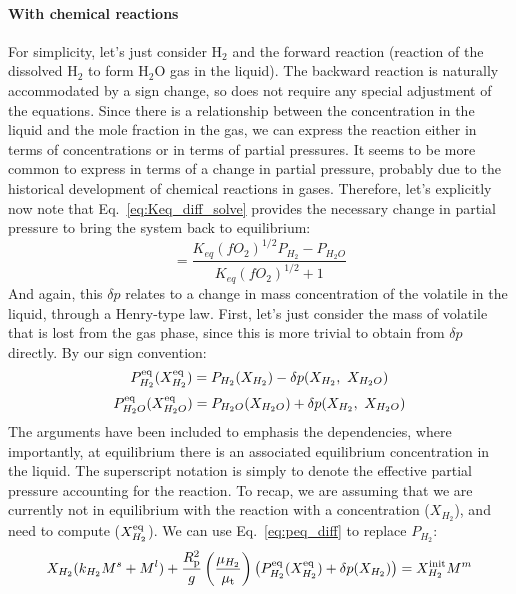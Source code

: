 \paragraph{With chemical reactions}
For simplicity, let's just consider H$_2$ and the forward reaction (reaction of the dissolved H$_2$ to form H$_2$O gas in the liquid).  The backward reaction is naturally accommodated by a sign change, so does not require any special adjustment of the equations.  Since there is a relationship between the concentration in the liquid and the mole fraction in the gas, we can express the reaction either in terms of concentrations or in terms of partial pressures.  It seems to be more common to express in terms of a change in partial pressure, probably due to the historical development of chemical reactions in gases.  Therefore, let's explicitly now note that Eq.~\ref{eq:Keq_diff_solve} provides the necessary change in partial pressure to bring the system back to equilibrium:
\begin{equation}
[\delta p] = \frac{K_{eq} (fO_2)^{1/2} P_{H_2} - P_{H_2O}}{K_{eq} (fO_2)^{1/2} + 1}
\label{eq:Keq_diff_solve2}
\end{equation}
And again, this $\delta p$ relates to a change in mass concentration of the volatile in the liquid, through a Henry-type law.  First, let's just consider the mass of volatile that is lost from the gas phase, since this is more trivial to obtain from $\delta p$ directly.  By our sign convention:
\begin{equation}
P_{H_2}^{\rm eq} (X_{H_2}^{\rm eq}) = P_{H_2}(X_{H_2}) - \delta p (X_{H_2},\ X_{H_2O})
\label{eq:peq_diff}
\end{equation}
\begin{equation}
P_{H_2O}^{\rm eq} (X_{H_2O}^{\rm eq}) = P_{H_2O} (X_{H_2O}) + \delta p (X_{H_2},\ X_{H_2O})
\end{equation}
The arguments have been included to emphasis the dependencies, where importantly, at equilibrium there is an associated equilibrium concentration in the liquid.  The superscript notation is simply to denote the effective partial pressure accounting for the reaction.  To recap, we are assuming that we are currently not in equilibrium with the reaction with a concentration ($X_{H_2}$), and need to compute ($X^{\rm eq}_{H_2}$).  We can use Eq.~\ref{eq:peq_diff} to replace $P_{H_2}$:
\begin{equation}
X_{H_2} (k_{H_2} M^s + M^l) + \frac{R_{\rm p}^2}{g} \left( \frac{\mu_{H_2}}{\mu_{\rm t}} \right) \left( P_{H_2}^{\rm eq}(X_{H_2}^{\rm eq})+\delta p (X_{H_2}) \right) = X_{H_2}^{\rm init} M^m
\end{equation}
